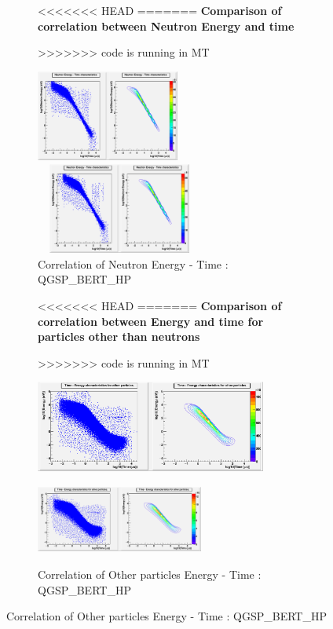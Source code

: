 \documentclass[twocolumn,amsmath,amssymb]{snp}
\begin{document}
\begin{figure}
\begin{figure}
    \centering 
<<<<<<< HEAD
=======
    \textbf{Comparison of correlation between Neutron Energy and time}\par\medskip
>>>>>>>  code is running in MT
    \begin{minipage}[b]{0.4\textwidth}
    \includegraphics [height=30mm, width=55 mm] {NeutEnergyTimeBIC.png}
    \caption{\small Correlation of Neutron Energy - Time : QGSP\_BIC\_HP}
    \end{minipage}
    \begin{minipage}[b]{0.4\textwidth}
    \includegraphics [height=30mm, width=55mm] {NeutEnergyTimeBERT.png}
    \caption{\small Correlation of Neutron Energy - Time : QGSP\_BERT\_HP}
    \end{minipage}
\end{figure}    


\begin{figure}
     \centering 
<<<<<<< HEAD
=======
     \textbf{Comparison of correlation between Energy and time for particles other than neutrons}\par\medskip
>>>>>>>  code is running in MT
    \begin{minipage}[b]{0.4\textwidth}
    \includegraphics [height=30mm, width=55 mm] {OtherEnergyTimeBIC.png}
    \caption{\small Correlation of Other particles Energy - Time : QGSP\_BIC\_HP}
    \end{minipage}
    \begin{minipage}[b]{0.4\textwidth}
    \includegraphics [height=30mm, width=55mm] {OtherEnergyTimeBERT.png}
    \caption{\small Correlation of Other particles Energy - Time : QGSP\_BERT\_HP}
    \end{minipage}
\end{figure}


\end{figure}
\end{document}
